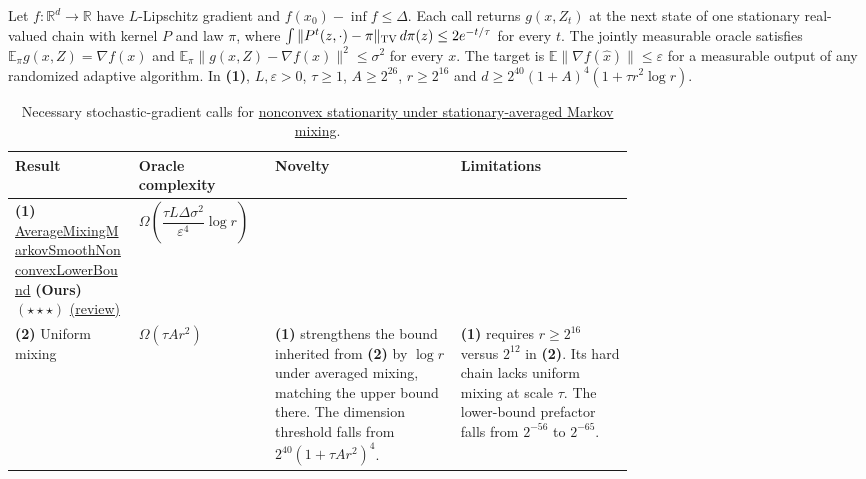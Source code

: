 \begin{table}[tp]
\centering
\caption{Necessary stochastic-gradient calls for \href{https://github.com/k3nfalt/longtails/blob/main/LongTails/Setups/HighDimensionalAverageMixingMarkovSmoothNonconvex.lean}{nonconvex stationarity under stationary-averaged Markov mixing}.}\label{tab:HighDimensionalAverageMixingMarkovSmoothNonconvex}
\parbox{\linewidth}{\footnotesize Let $f:\mathbb R^d\to\mathbb R$ have $L$-Lipschitz gradient and $f(x_0)-\inf f\le\Delta$. Each call returns $g(x,Z_t)$ at the next state of one stationary real-valued chain with kernel $P$ and law $\pi$, where $\int\|P^t(z,\cdot)-\pi\|_{\rm TV}\,d\pi(z)\le 2e^{-t/\tau}$ for every $t$. The jointly measurable oracle satisfies $\mathbb E_\pi g(x,Z)=\nabla f(x)$ and $\mathbb E_\pi\|g(x,Z)-\nabla f(x)\|^2\le\sigma^2$ for every $x$. The target is $\mathbb E\|\nabla f(\hat x)\|\le\varepsilon$ for a measurable output of any randomized adaptive algorithm. In \textbf{(1)}, $L,\varepsilon>0$, $\tau\ge1$, $A\ge2^{26}$, $r\ge2^{16}$ and $d\ge2^{40}(1+A)^4(1+\tau r^2\log r)$.}\par\smallskip
\begin{threeparttable}
\footnotesize
\setlength{\tabcolsep}{4pt}\renewcommand{\arraystretch}{1.25}
\begin{tabularx}{\linewidth}{@{}>{\raggedright\arraybackslash}p{0.20\linewidth}>{\raggedright\arraybackslash}p{0.22\linewidth}>{\raggedright\arraybackslash}p{0.30\linewidth}>{\raggedright\arraybackslash}X@{}}
\toprule
\textbf{Result} & \textbf{Oracle complexity} & \textbf{Novelty} & \textbf{Limitations} \\
\midrule
\textbf{(1)} \href{https://github.com/k3nfalt/longtails/blob/main/LongTails/Theorems/AverageMixingMarkovSmoothNonconvexLowerBound.lean}{Average\allowbreak Mixing\allowbreak Markov\allowbreak Smooth\allowbreak Nonconvex\allowbreak Lower\allowbreak Bound} \textbf{(Ours)} $(\star\star\star)$ \href{https://github.com/k3nfalt/longtails/blob/main/scripts/reviews/AverageMixingMarkovSmoothNonconvexLowerBound.md}{(review)}
& $\Omega\!\left(\dfrac{\tau L\Delta\sigma^2}{\varepsilon^4}\log r\right)$ & & \\
\midrule[1.2pt]
\textbf{(2)} Uniform mixing \citep{hdamUniformLower}
& $\Omega(\tau A r^2)$
& \textbf{(1)} strengthens the bound inherited from \textbf{(2)} by $\log r$ under averaged mixing, matching the upper bound there. The dimension threshold falls from $2^{40}(1+\tau A r^2)^4$.
& \textbf{(1)} requires $r\ge2^{16}$ versus $2^{12}$ in \textbf{(2)}. Its hard chain lacks uniform mixing at scale $\tau$. The lower-bound prefactor falls from $2^{-56}$ to $2^{-65}$. \\

\end{tabularx}
\end{threeparttable}
\end{table}
